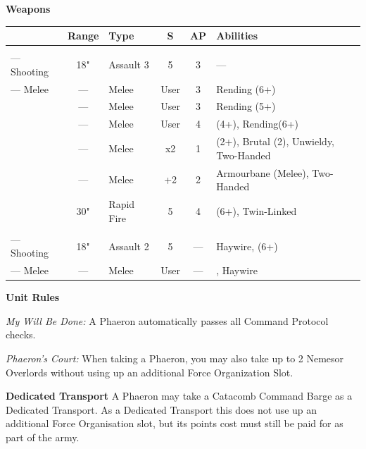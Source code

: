 \begin{minipage}[t]{0.72\textwidth}
	\vspace*{2em}
	\textbf{Weapons}
	
	\begin{tabular}{L{90 pt} c C{40pt} *{2}{c} >{\raggedright\arraybackslash}p{130pt}}
		& Range & Type & S & AP & Abilities \\
		\hline
		 & & &  &  &  \\
		— Shooting & 18" & Assault 3 & 5 & 3 & — \\
		— Melee & — & Melee & User & 3 & Rending (6+) \\
		 & — & Melee & User & 3 & Rending (5+) \\
		 & — & Melee & User & 4 &  (4+), Rending(6+) \\
		 & — & Melee & x2 & 1 &  (2+), Brutal (2), Unwieldy, Two-Handed \\
		 & — & Melee & +2 & 2 & Armourbane (Melee), Two-Handed \\
		 & 30" & Rapid Fire & 5 & 4 &  (6+), Twin-Linked \\	
		 & & &  &  &  \\
		— Shooting & 18" & Assault 2 & 5 & — & Haywire,  (6+) \\
		— Melee & — & Melee & User & — & , Haywire \\
	\end{tabular}
	
	\vspace*{2em}
	\textbf{Unit Rules}
	
	\textit{My Will Be Done:} A Phaeron automatically passes all Command Protocol checks.
	
	\textit{Phaeron's Court:} When taking a Phaeron, you may also take up to 2 Nemesor Overlords without using up an additional Force Organization Slot. 
	
	\vspace*{2em}
	\textbf{Dedicated Transport}
	A Phaeron may take a Catacomb Command Barge as a Dedicated Transport. As a Dedicated Transport this does not use up an additional Force Organisation slot, but its points cost must still be paid for as part of the army.
	

\end{minipage}
